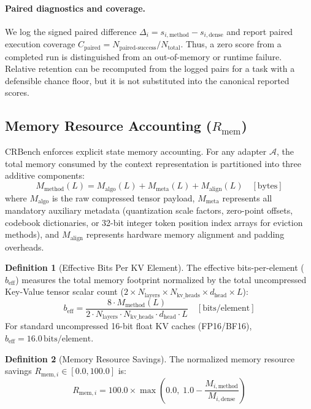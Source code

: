 \documentclass[10pt]{article}
\theoremstyle{definition}
\newtheorem{definition}{Definition}
\begin{document}
\paragraph{Paired diagnostics and coverage.} We log the signed paired difference $\Delta_i=s_{i,\text{method}}-s_{i,\text{dense}}$ and report paired execution coverage $C_{\text{paired}}=N_{\text{paired-success}}/N_{\text{total}}$. Thus, a zero score from a completed run is distinguished from an out-of-memory or runtime failure. Relative retention can be recomputed from the logged pairs for a task with a defensible chance floor, but it is not substituted into the canonical reported scores.

\subsection{Memory Resource Accounting (\texorpdfstring{$R_{\text{mem}}$}{R\_mem})}
CRBench enforces explicit state memory accounting. For any adapter $\mathcal{A}$, the total memory consumed by the context representation is partitioned into three additive components:
\begin{equation}
\label{eq:memory_decomposition}
M_{\text{method}}(L) = M_{\text{algo}}(L) + M_{\text{meta}}(L) + M_{\text{align}}(L) \quad [\text{bytes}]
\end{equation}
where $M_{\text{algo}}$ is the raw compressed tensor payload, $M_{\text{meta}}$ represents all mandatory auxiliary metadata (quantization scale factors, zero-point offsets, codebook dictionaries, or 32-bit integer token position index arrays for eviction methods), and $M_{\text{align}}$ represents hardware memory alignment and padding overheads.

\begin{definition}[Effective Bits Per KV Element]
The effective bits-per-element ($b_{\text{eff}}$) measures the total memory footprint normalized by the total uncompressed Key-Value tensor scalar count ($2 \times N_{\text{layers}} \times N_{\text{kv\_heads}} \times d_{\text{head}} \times L$):
\begin{equation}
\label{eq:beff}
b_{\text{eff}} = \frac{8 \cdot M_{\text{method}}(L)}{2 \cdot N_{\text{layers}} \cdot N_{\text{kv\_heads}} \cdot d_{\text{head}} \cdot L} \quad [\text{bits/element}]
\end{equation}
For standard uncompressed 16-bit float KV caches (FP16/BF16), $b_{\text{eff}} = 16.0\,\text{bits/element}$.
\end{definition}

\begin{definition}[Memory Resource Savings]
The normalized memory resource savings $R_{\text{mem}, i} \in [0.0, 100.0]$ is:
\begin{equation}
\label{eq:resource_savings}
R_{\text{mem}, i} = 100.0 \times \max\left(0.0, \; 1.0 - \frac{M_{i, \text{method}}}{M_{i, \text{dense}}}\right)
\end{equation}
\end{definition}
\end{document}
